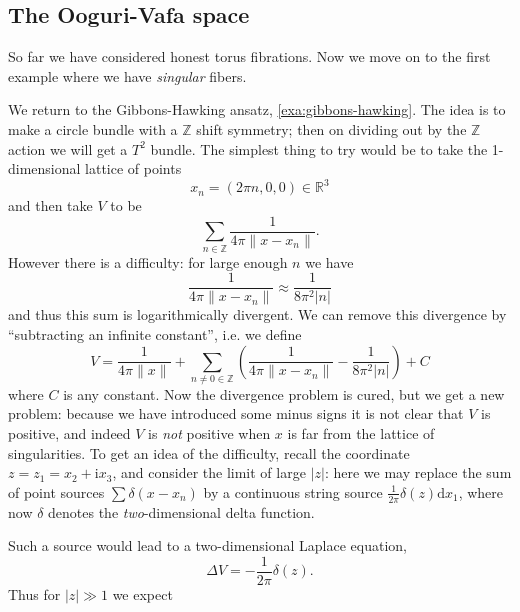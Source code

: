 \documentclass[12pt,letterpaper,reqno]{article}
\numberwithin{equation}{section}
\newcommand{\R}{\ensuremath{\mathbb R}}
\newcommand{\Z}{\ensuremath{\mathbb Z}}
\newcommand{\I}{{\mathrm i}}
\newcommand{\de}{\mathrm{d}}
\newcommand{\abs}[1]{\lvert#1\rvert}
\newcommand{\norm}[1]{\lVert#1\rVert}
\newcommand{\ti}[1]{\textit{#1}}
\newcommand{\insfig}[2]{

\medskip
\noindent
\begin{minipage}{\linewidth}

\makebox[\linewidth]{\texttt{[image: figures/\#1-crop.pdf]}}

\end{minipage}
\medskip

}
\begin{document}
\subsection{The Ooguri-Vafa space}

So far we have considered
honest torus fibrations. Now we move on to the first example
where we have \ti{singular} fibers.

\begin{example} \label{exa:ooguri-vafa} \cite{OV1996}
We return to the Gibbons-Hawking
ansatz, \autoref{exa:gibbons-hawking}. The idea is to make a circle
bundle with a $\Z$ shift symmetry; then on dividing out by the $\Z$
action we will get a $T^2$ bundle. The simplest thing to try
would be to take the 1-dimensional lattice of points
\begin{equation}
  x_n = (2 \pi n,0,0) \in \R^3
\end{equation}
and then take $V$ to be
\begin{equation}
 \sum_{n \in \Z} \frac{1}{4\pi\norm{x-x_n}}.
\end{equation}
However there is a difficulty: for large enough $n$
we have
\begin{equation}
  \frac{1}{4 \pi \norm{x-x_n}} \approx \frac{1}{8 \pi^2 \abs{n}}
\end{equation}
and thus this sum is logarithmically divergent. We
can remove this divergence by ``subtracting an infinite constant'',
i.e. we define
\begin{equation} \label{eq:ooguri-vafa-V}
  V = \frac{1}{4 \pi \norm{x}} + \sum_{n \neq 0 \in \Z} \left( \frac{1}{4\pi\norm{x-x_n}} - \frac{1}{8\pi^2 \abs{n}} \right) + C
\end{equation}
where $C$ is any constant.
Now the divergence problem is cured, but we get a
new problem: because we have
introduced some minus signs it is not clear that $V$
is positive, and indeed $V$ is \ti{not} positive when
$x$ is far from the lattice of singularities.
To get an idea of the difficulty, recall the
coordinate $z = z_1 = x_2 + \I x_3$,
and consider the limit of large $\abs{z}$: here
we may replace the sum of point sources $\sum \delta(x-x_n)$
by a continuous string source $\frac{1}{2\pi} \delta(z) \de x_1$, where now
$\delta$ denotes the \ti{two}-dimensional delta function.
\insfig{higgs-bundles-11}{1.1}
Such a source would lead to a two-dimensional Laplace equation,
\begin{equation}
  \Delta V = -\frac{1}{2\pi}\delta(z).
\end{equation}
Thus for $\abs{z} \gg 1$ we expect

\end{example}
\end{document}

